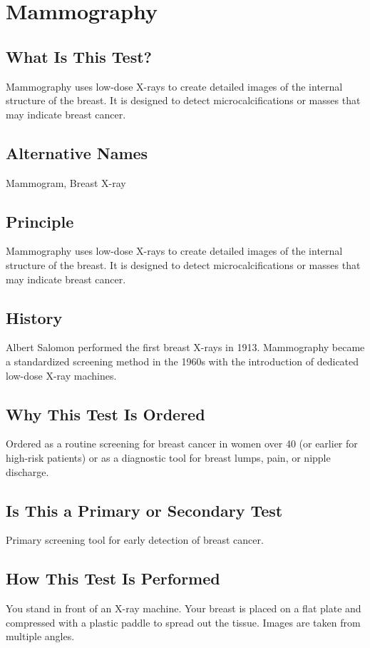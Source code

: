 \chapter{Mammography}

\section*{What Is This Test?}
Mammography uses low-dose X-rays to create detailed images of the internal structure of the breast. It is designed to detect microcalcifications or masses that may indicate breast cancer.

\section*{Alternative Names}
Mammogram, Breast X-ray

\section*{Principle}
Mammography uses low-dose X-rays to create detailed images of the internal structure of the breast. It is designed to detect microcalcifications or masses that may indicate breast cancer.

\section*{History}
Albert Salomon performed the first breast X-rays in 1913. Mammography became a standardized screening method in the 1960s with the introduction of dedicated low-dose X-ray machines.

\section*{Why This Test Is Ordered}
Ordered as a routine screening for breast cancer in women over 40 (or earlier for high-risk patients) or as a diagnostic tool for breast lumps, pain, or nipple discharge.

\section*{Is This a Primary or Secondary Test}
Primary screening tool for early detection of breast cancer.

\section*{How This Test Is Performed}
You stand in front of an X-ray machine. Your breast is placed on a flat plate and compressed with a plastic paddle to spread out the tissue. Images are taken from multiple angles.

